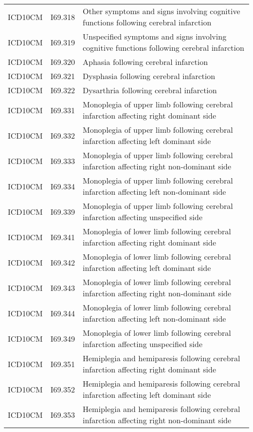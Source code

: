 \begin{longtable}{p{}p{}p{}}
  ICD10CM & I69.318 & Other symptoms and signs involving cognitive functions following cerebral infarction \\ 
  ICD10CM & I69.319 & Unspecified symptoms and signs involving cognitive functions following cerebral infarction \\ 
  ICD10CM & I69.320 & Aphasia following cerebral infarction \\ 
  ICD10CM & I69.321 & Dysphasia following cerebral infarction \\ 
  ICD10CM & I69.322 & Dysarthria following cerebral infarction \\ 
  ICD10CM & I69.331 & Monoplegia of upper limb following cerebral infarction affecting right dominant side \\ 
  ICD10CM & I69.332 & Monoplegia of upper limb following cerebral infarction affecting left dominant side \\ 
  ICD10CM & I69.333 & Monoplegia of upper limb following cerebral infarction affecting right non-dominant side \\ 
  ICD10CM & I69.334 & Monoplegia of upper limb following cerebral infarction affecting left non-dominant side \\ 
  ICD10CM & I69.339 & Monoplegia of upper limb following cerebral infarction affecting unspecified side \\ 
  ICD10CM & I69.341 & Monoplegia of lower limb following cerebral infarction affecting right dominant side \\ 
  ICD10CM & I69.342 & Monoplegia of lower limb following cerebral infarction affecting left dominant side \\ 
  ICD10CM & I69.343 & Monoplegia of lower limb following cerebral infarction affecting right non-dominant side \\ 
  ICD10CM & I69.344 & Monoplegia of lower limb following cerebral infarction affecting left non-dominant side \\ 
  ICD10CM & I69.349 & Monoplegia of lower limb following cerebral infarction affecting unspecified side \\ 
  ICD10CM & I69.351 & Hemiplegia and hemiparesis following cerebral infarction affecting right dominant side \\ 
  ICD10CM & I69.352 & Hemiplegia and hemiparesis following cerebral infarction affecting left dominant side \\ 
  ICD10CM & I69.353 & Hemiplegia and hemiparesis following cerebral infarction affecting right non-dominant side \\ 

\end{longtable}

